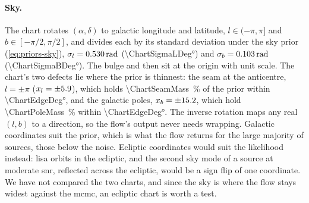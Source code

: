 \paragraph{Sky.}
The chart rotates $(\alpha,\delta)$ to galactic longitude and latitude, $l\in(-\pi,\pi]$ and
$b\in[-\pi/2,\pi/2]$, and divides each by its standard deviation under the sky prior
(\cref{eq:priors-sky}), $\sigma_l = \qty{0.530}{\radian}$ (\ang{\ChartSigmaLDeg}) and
$\sigma_b = \qty{0.103}{\radian}$ (\ang{\ChartSigmaBDeg}). The bulge and  then sit at the
origin with unit scale. The chart's two defects lie where the prior is thinnest: the seam at the
anticentre, $l=\pm\pi$ ($x_l=\pm5.9{}$), which holds \qty{\ChartSeamMass}{\percent} of the prior within
\ang{\ChartEdgeDeg}, and the galactic poles, $x_b=\pm15.2{}$, which hold \qty{\ChartPoleMass}{\percent}
within \ang{\ChartEdgeDeg}. The inverse rotation maps any real $(l, b)$ to a direction, so the
flow's output never needs wrapping.
Galactic coordinates suit the prior, which is what the flow returns for the large majority of sources,
those below the noise. Ecliptic coordinates would suit the likelihood instead: \ac{lisa} orbits in the
ecliptic, and the second sky mode of a source at moderate \ac{snr}, reflected across the ecliptic, would
be a sign flip of one coordinate. We have not compared the two charts, and since the sky is where the
flow stays widest against the \ac{mcmc}, an ecliptic chart is worth a test.

